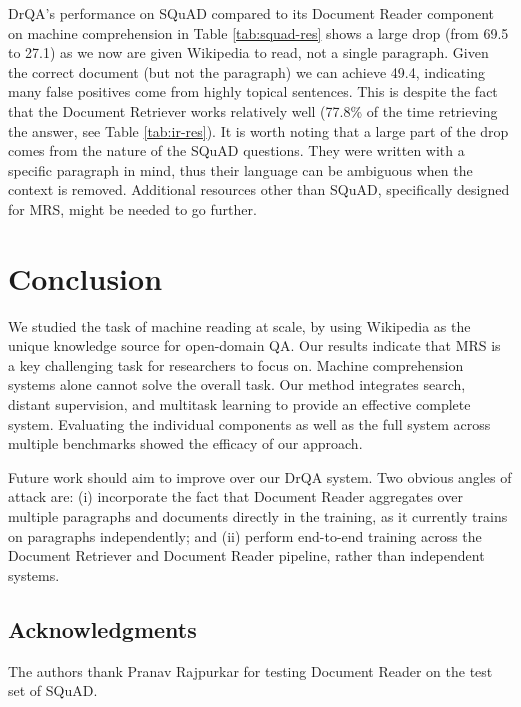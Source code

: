\documentclass[11pt,a4paper]{article}
\newcommand\us{DrQA\xspace}
\begin{document}
\us's performance on SQuAD compared to its Document Reader component on machine comprehension in Table \ref{tab:squad-res} shows a large drop (from 69.5 to 27.1)
as we now are given Wikipedia to read, not a single paragraph.
Given the correct document (but not the paragraph) we can achieve 49.4, indicating many false positives
come from highly topical sentences.
This is despite the fact that the Document Retriever works relatively well (77.8\% of the time retrieving the answer, see Table \ref{tab:ir-res}).
It is worth noting that a large part of the drop comes from the nature of the SQuAD questions. They were written with a specific paragraph in mind, thus their language can be ambiguous when the context is removed. Additional resources other than SQuAD, specifically designed for MRS, might be needed to go further.
















\section{Conclusion} \label{sec:conc}

We studied the task of machine reading at scale, by using Wikipedia as the unique knowledge source for open-domain QA. Our results indicate that MRS is a key challenging task for researchers to focus on. Machine comprehension systems alone cannot solve the overall task. Our method integrates search,
distant supervision, and multitask learning to provide an effective complete system.
Evaluating the individual components as well as the full system across multiple benchmarks showed the efficacy of our approach.

Future work should aim to improve over our \us system.
Two obvious angles of attack are:  (i) incorporate the fact that Document Reader aggregates over multiple paragraphs and documents directly in the training, as it currently trains on paragraphs independently; and (ii) perform end-to-end training across the Document Retriever and Document Reader pipeline, rather than independent systems.



\subsection*{Acknowledgments}
The authors thank Pranav Rajpurkar for testing Document Reader on the test set of SQuAD.



\end{document}
